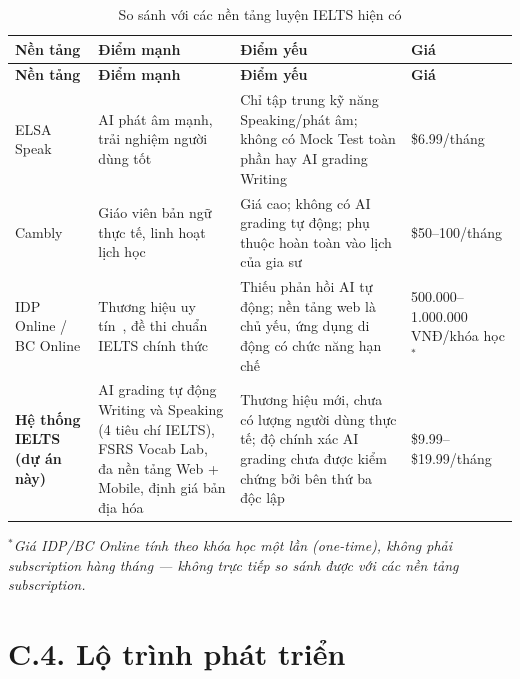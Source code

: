 \setlength{\tbu}{\dimexpr(\linewidth - 8\tabcolsep - 5\arrayrulewidth)/140\relax}
\begin{longtable}{|p{28\tbu}|p{45\tbu}|p{37\tbu}|p{30\tbu}|}
    \caption{So sánh với các nền tảng luyện IELTS hiện có}
    \label{tab:competitor} \\
    \hline
    \textbf{Nền tảng} & \textbf{Điểm mạnh} & \textbf{Điểm yếu} & \textbf{Giá} \\ \hline
    \endfirsthead
    \hline
    \textbf{Nền tảng} & \textbf{Điểm mạnh} & \textbf{Điểm yếu} & \textbf{Giá} \\ \hline
    \endhead
    \hline
    \endfoot
    \hline
    \endlastfoot
    ELSA Speak~\cite{elsa-speak-pricing}
      & AI phát âm mạnh, trải nghiệm người dùng tốt
      & Chỉ tập trung kỹ năng Speaking/phát âm; không có Mock Test toàn phần hay AI grading Writing
      & \$6.99/tháng \\ \hline
    Cambly~\cite{cambly-pricing}
      & Giáo viên bản ngữ thực tế, linh hoạt lịch học
      & Giá cao; không có AI grading tự động; phụ thuộc hoàn toàn vào lịch của gia sư
      & \$50--100/tháng \\ \hline
    IDP Online / BC Online
      & Thương hiệu uy tín~\cite{ielts-global-stats}, đề thi chuẩn IELTS chính thức
      & Thiếu phản hồi AI tự động; nền tảng web là chủ yếu, ứng dụng di động có chức năng hạn chế
      & 500.000--1.000.000 VNĐ/khóa học$^*$ \\ \hline
    \textbf{Hệ thống IELTS (dự án này)}
      & AI grading tự động Writing và Speaking (4 tiêu chí IELTS), FSRS Vocab Lab, đa nền tảng Web + Mobile, định giá bản địa hóa
      & Thương hiệu mới, chưa có lượng người dùng thực tế; độ chính xác AI grading chưa được kiểm chứng bởi bên thứ ba độc lập
      & \$9.99--\$19.99/tháng \\ \hline
\end{longtable}

\noindent\textit{$^*$Giá IDP/BC Online tính theo khóa học một lần (one-time), không phải subscription hàng tháng --- không trực tiếp so sánh được với các nền tảng subscription.}

\section*{C.4. Lộ trình phát triển}

